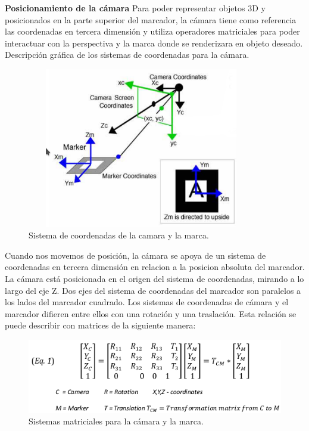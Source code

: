 \textbf{Posicionamiento de la cámara} Para poder representar objetos 3D y posicionados en la parte superior del marcador, la cámara tiene como referencia las coordenadas en tercera dimensión y utiliza operadores matriciales para poder interactuar con la perspectiva y la marca donde se renderizara en objeto deseado. Descripción gráfica de los sistemas de coordenadas para la cámara.
\begin{figure}[h!]
	\centering
	\includegraphics[width=10cm,height=7cm]{imagenes/marcoteorico/plataformas/positionMarkerARToolKit.png}
	\caption{Sistema de coordenadas de la camara y la marca.\cite{B13}}
	\label{fig:analogo}
\end{figure}

Cuando nos movemos de posición, la cámara se apoya de un sistema de coordenadas  en tercera dimensión en relacion a la posicion absoluta del marcador. La cámara está posicionada en el origen del sistema de coordenadas, mirando a lo largo del eje Z. Dos ejes del sistema de coordenadas del marcador son paralelos a los lados del marcador cuadrado. Los sistemas de coordenadas de cámara y el marcador difieren entre ellos con una rotación y una traslación. Esta relación se puede describir con matrices de la siguiente manera:
\begin{figure}[h!]
	\centering
	\includegraphics[width=12cm]{imagenes/marcoteorico/plataformas/eq01ArToolKit.png}
	\caption{Sistemas matriciales para la cámara y la marca.\cite{B13}}
	\label{fig:analogo}
\end{figure}
\newpage

